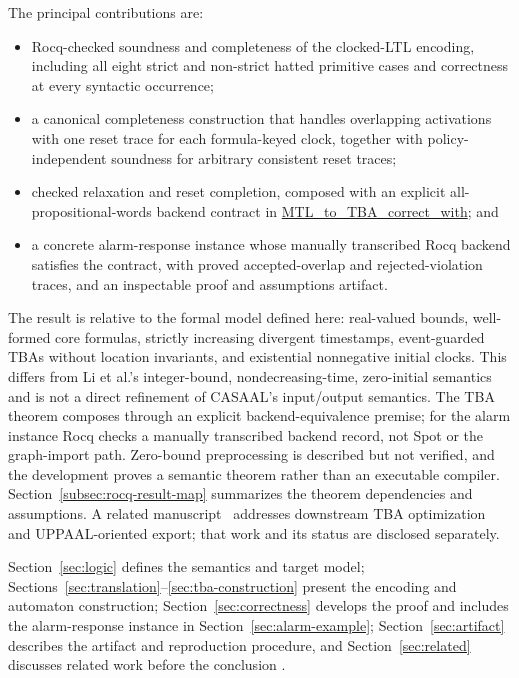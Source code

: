 \documentclass{ieeeaccess}
\newcommand{\Rocqid}[1]{\url{#1}}
\begin{document}
The principal contributions are:
\begin{itemize}
  \item Rocq-checked soundness and completeness of the clocked-LTL encoding,
        including all eight strict and non-strict hatted primitive cases and
        correctness at every syntactic occurrence;
  \item a canonical completeness construction that handles overlapping
        activations with one reset trace for each formula-keyed clock,
        together with policy-independent soundness for arbitrary consistent
        reset traces;
  \item checked relaxation and reset completion, composed with an explicit
        all-propositional-words backend contract in
        \Rocqid{MTL_to_TBA_correct_with}; and
  \item a concrete alarm-response instance whose manually transcribed Rocq
        backend satisfies the contract, with proved accepted-overlap and
        rejected-violation traces, and an inspectable proof and assumptions
        artifact.
\end{itemize}

The result is relative to the formal model defined here: real-valued bounds,
well-formed core formulas, strictly increasing divergent timestamps,
event-guarded TBAs without location invariants, and existential nonnegative
initial clocks. This differs from Li et al.'s integer-bound,
nondecreasing-time, zero-initial semantics and is not a direct refinement of
CASAAL's input/output semantics. The TBA theorem composes through an explicit
backend-equivalence premise; for the alarm instance Rocq checks a manually
transcribed backend record, not Spot or the graph-import path. Zero-bound
preprocessing is described but not verified, and the development proves a
semantic theorem rather than an executable compiler. Section~\ref{subsec:rocq-result-map}
summarizes the theorem dependencies and assumptions.
A related manuscript~\cite{fares_bodeveix_tba_optimization} addresses
downstream TBA optimization and UPPAAL-oriented export; that work and its
status are disclosed separately.

Section~\ref{sec:logic} defines the semantics and target model;
Sections~\ref{sec:translation}--\ref{sec:tba-construction} present the encoding and
automaton construction; Section~\ref{sec:correctness} develops the proof and
includes the alarm-response instance in Section~\ref{sec:alarm-example};
Section~\ref{sec:artifact} describes the artifact and reproduction procedure,
and Section~\ref{sec:related} discusses related work before the conclusion
.
\end{document}
